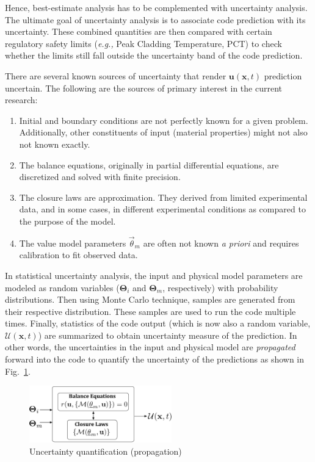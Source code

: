 \documentclass[11pt,titlepage]{article}
\begin{document}
Hence, best-estimate analysis has to be complemented with uncertainty analysis.
The ultimate goal of uncertainty analysis is to associate code prediction with its uncertainty. 
These combined quantities are then compared with certain regulatory safety limits (\textit{e.g.,} Peak Cladding Temperature, PCT) to check whether the limits still fall outside the uncertainty band of the code prediction.

There are several known sources of uncertainty that render $\mathbf{u}(\mathbf{x}, t)$ prediction uncertain.
The following are the sources of primary interest in the current research:
\begin{enumerate}
	\item Initial and boundary conditions are not perfectly known for a given problem. Additionally, other constituents of input (material properties) might not also not known exactly.
	\item The balance equations, originally in partial differential equations, are discretized and solved with finite precision.
	\item The closure laws are approximation. They derived from limited experimental data, and in some cases, in different experimental conditions as compared to the purpose of the model.
	\item The value model parameters $\vec{\theta}_m$ are often not known \emph{a priori} and requires calibration to fit observed data.
\end{enumerate}

In statistical uncertainty analysis, the input and physical model parameters are modeled as random variables ($\mathbf{\Theta}_i$ and $\mathbf{\Theta}_m$, respectively) with probability distributions. 
Then using Monte Carlo technique, samples are generated from their respective distribution.
These samples are used to run the code multiple times. 
Finally, statistics of the code output (which is now also a random variable, $\mathbf{\mathcal{U}}(\mathbf{x},t)$) are summarized to obtain uncertainty measure of the prediction. 
In other words, the uncertainties in the input and physical model are \emph{propagated} forward into the code to quantify the uncertainty of the predictions as shown in Fig.~\ref{fig:forwardUQ}.
\begin{figure}[htbp]
	\centering
	\includegraphics[width=0.55\textwidth]{forwardUQ.pdf}
	\caption{Uncertainty quantification (propagation)}
	\label{fig:forwardUQ}
\end{figure}
\end{document}
